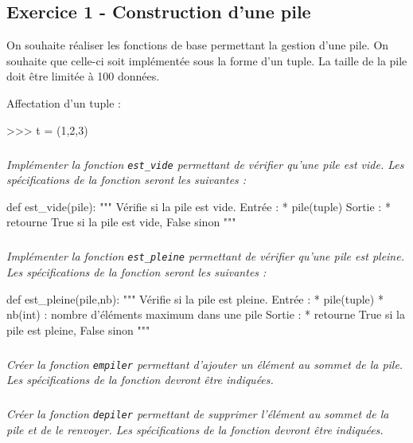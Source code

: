 \documentclass[10pt,fleqn]{article} %
\begin{document}

\vspace{8cm}
\pagestyle{fancy}
\thispagestyle{plain}


\def\columnseprulecolor{\color{ocre}}
\setlength{\columnseprule}{0.4pt} 
\begin{multicols}{2}
\section*{Exercice 1 - Construction d'une pile}
On souhaite réaliser les fonctions de base permettant la gestion d'une pile. On souhaite que celle-ci soit implémentée sous la forme d'un tuple. La taille de la pile doit être limitée à 100 données. 
\begin{rappel}
Affectation d'un tuple : 
\begin{python}
>>> t = (1,2,3)
\end{python}
\end{rappel}
\subparagraph{}\textit{Implémenter la fonction \texttt{est\_vide} permettant de vérifier qu'une pile est vide. Les spécifications de la fonction seront les suivantes : }
\begin{py}
\begin{python}
def est_vide(pile):
    """
    Vérifie si la pile est vide.
    Entrée : 
     * pile(tuple)
    Sortie : 
     * retourne True si la pile est vide, False 
     sinon
    """
\end{python}
\end{py}
\subparagraph{}\textit{Implémenter la fonction \texttt{est\_pleine} permettant de vérifier qu'une pile est pleine. Les spécifications de la fonction seront les suivantes :}
\begin{py}
\begin{python}
def est_pleine(pile,nb):
    """
    Vérifie si la pile est pleine.
    Entrée : 
     * pile(tuple)
     * nb(int) : nombre d'éléments maximum dans une pile
    Sortie : 
     * retourne True si la pile est pleine, False 
     sinon
    """
\end{python}
\end{py}
\subparagraph{}\textit{Créer la fonction \texttt{empiler} permettant d'ajouter un élément au sommet de la pile. Les spécifications de la fonction devront être indiquées.}

\subparagraph{}\textit{Créer la fonction \texttt{depiler} permettant de supprimer l'élément au sommet de la pile et de le renvoyer. Les spécifications de la fonction devront être indiquées.}


\end{multicols}
\end{document}
